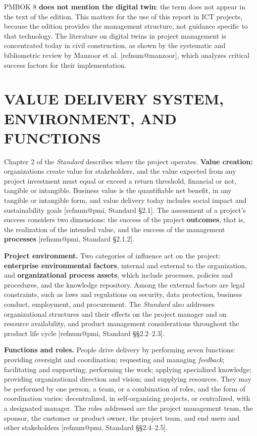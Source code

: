 \documentclass[12pt,a4paper,article,oneside,brazil,english]{abntex2}
\makeatletter
\newcommand{\refnum}[1]{\csname refnum@#1\endcsname}
\makeatother
\begin{document}
PMBOK 8 \textbf{does not mention the digital twin}: the term does not appear in the text of the edition. This matters for the use of this report in ICT projects, because the edition provides the management structure, not guidance specific to that technology. The literature on digital twins in project management is concentrated today in civil construction, as shown by the systematic and bibliometric review by Manzoor et al. [\refnum{manzoor}], which analyzes critical success factors for their implementation.

\section{VALUE DELIVERY SYSTEM, ENVIRONMENT, AND FUNCTIONS}

Chapter 2 of the \textit{Standard} describes where the project operates. \textbf{Value creation:} organizations create value for stakeholders, and the value expected from any project investment must equal or exceed a return threshold, financial or not, tangible or intangible. Business value is the quantifiable net benefit, in any tangible or intangible form, and value delivery today includes social impact and sustainability goals [\refnum{pmi}, Standard §2.1]. The assessment of a project's success considers two dimensions: the success of the project \textbf{outcomes}, that is, the realization of the intended value, and the success of the management \textbf{processes} [\refnum{pmi}, Standard §2.1.2].

\textbf{Project environment.} Two categories of influence act on the project: \textbf{enterprise environmental factors}, internal and external to the organization, and \textbf{organizational process assets}, which include processes, policies and procedures, and the knowledge repository. Among the external factors are legal constraints, such as laws and regulations on security, data protection, business conduct, employment, and procurement. The \textit{Standard} also addresses organizational structures and their effects on the project manager and on resource availability, and product management considerations throughout the product life cycle [\refnum{pmi}, Standard §§2.2–2.3].

\textbf{Functions and roles.} People drive delivery by performing seven functions: providing oversight and coordination; requesting and managing \textit{feedback}; facilitating and supporting; performing the work; applying specialized knowledge; providing organizational direction and vision; and supplying resources. They may be performed by one person, a team, or a combination of roles, and the form of coordination varies: decentralized, in self-organizing projects, or centralized, with a designated manager. The roles addressed are the project management team, the sponsor, the customer or product owner, the project team, and end users and other stakeholders [\refnum{pmi}, Standard §§2.4–2.5].
\end{document}

